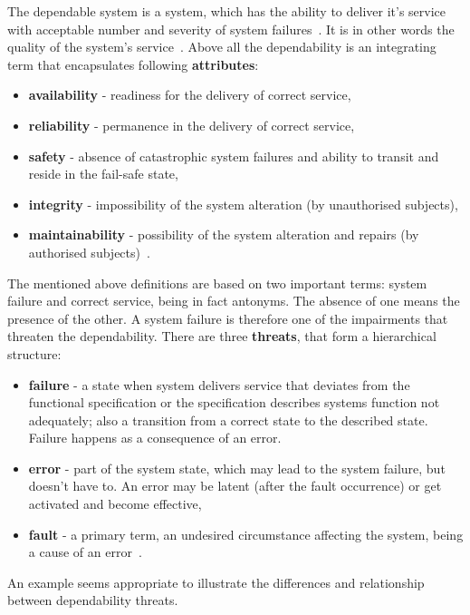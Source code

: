 \documentclass[]{myclass}
\begin{document}
The dependable system is a system, which has the ability to deliver it's service with acceptable number and severity of system failures~\cite{art:Avizienis}. It is in other words the quality of the system's service~\cite{art:Laprie}. Above all the dependability is an integrating term that encapsulates following \textbf{attributes}:
\begin{itemize}
\item \textbf{availability} - readiness for the delivery of correct service,
\item \textbf{reliability} - permanence in the delivery of correct service,
\item \textbf{safety} - absence of catastrophic system failures and ability to transit and reside in the fail-safe state,
\item \textbf{integrity} - impossibility of the system alteration (by unauthorised subjects),
\item \textbf{maintainability} - possibility of the system alteration and repairs (by authorised subjects)~\cite{art:Laprie}\cite{art:Avizienis}.
\end{itemize}
The mentioned above definitions are based on two important terms: system failure and correct service, being in fact antonyms. The absence of one means the presence of the other. A system failure is therefore one of the impairments that threaten the  dependability. There are three \textbf{threats}, that form a hierarchical structure:
\begin{itemize}
    \item \textbf{failure} - a state when system delivers service that deviates from the functional specification or the specification describes systems function not adequately; also a transition from a correct state to the described state. Failure happens as a consequence of an error.
    \item \textbf{error} - part of the system state, which may lead to the system failure, but doesn't have to. An error may be latent (after the fault occurrence) or get activated and become effective,
    \item \textbf{fault} - a primary term, an undesired circumstance affecting the system, being a cause of an error~\cite{art:Avizienis}. 
\end{itemize}
An example seems appropriate to illustrate the differences and relationship between dependability threats. \\
\end{document}
